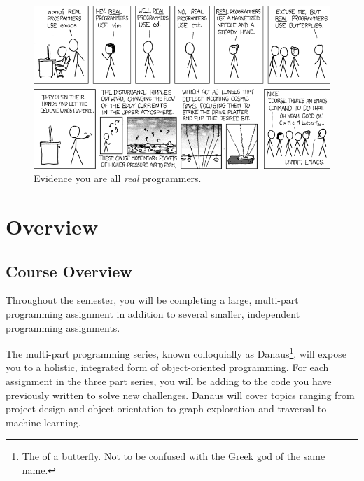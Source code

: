 \documentclass{pset}
\begin{document}
\begin{figure}[H]
    \centering
    \includegraphics[width=\textwidth]{img/xkcd.png}
    \caption{Evidence you are all \emph{real} programmers.}
    \label{fig:xkcd}
\end{figure}
\vspace{\fill}
\clearpage
\fi

\ifx \TOC \undefined \else
\newpage
\tableofcontents
\newpage
\fi

\ifx \OVERVIEW \undefined \else
\section{Overview}
\ifx \COURSEOVERVIEW \undefined \else
\subsection{Course Overview}
Throughout the semester, you will be completing a large, multi-part
programming assignment in addition to several smaller, independent programming
assignments.

The multi-part programming series, known colloquially as Danaus\footnote{The
 of a butterfly.  Not
to be confused with the Greek god of the same name.}, will expose you to a
holistic, integrated form of object-oriented programming. For each assignment
in the three part series, you will be adding to the code you have previously
written to solve new challenges. Danaus will cover topics ranging from project
design and object orientation to graph exploration and traversal to machine
learning.
\end{document}

